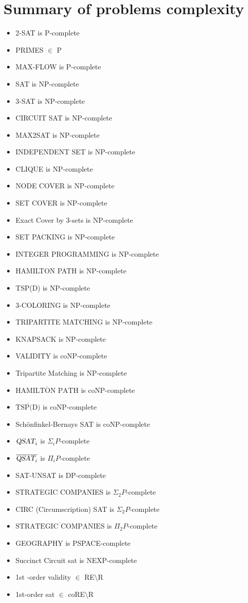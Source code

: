 \section{Summary of problems complexity}
\begin{itemize}
    \item 2-SAT is P-complete
    \item PRIMES $\in$ P
    \item MAX-FLOW is P-complete
    \item SAT is NP-complete
    \item 3-SAT is NP-complete
    \item CIRCUIT SAT is NP-complete
    \item MAX2SAT is NP-complete
    \item INDEPENDENT SET is NP-complete
    \item CLIQUE is NP-complete
    \item NODE COVER is NP-complete
    \item SET COVER is NP-complete
    \item Exact Cover by 3-sets is NP-complete
    \item SET PACKING is NP-complete
    \item INTEGER PROGRAMMING is NP-complete
    \item HAMILTON PATH is NP-complete
    \item TSP(D) is NP-complete
    \item 3-COLORING is NP-complete
    \item TRIPARTITE MATCHING is NP-complete
    \item KNAPSACK is NP-complete
    \item VALIDITY is coNP-complete
    \item Tripartite Matching is NP-complete
    \item $\overline{\text{HAMILTON PATH}}$ is coNP-complete
    \item $\overline{\text{TSP(D)}}$ is coNP-complete
    \item Schönfinkel-Bernays SAT is coNP-complete
    \item $\textsl{QSAT}_i$ is $\Sigma_iP$-complete
    \item $\overline{\textsl{QSAT}_i}$ is $\Pi_iP$-complete
    \item SAT-UNSAT is DP-complete
    \item STRATEGIC COMPANIES is $\Sigma_2P$-complete
    \item CIRC (Circumscription) SAT is $\Sigma_2P$-complete
    \item $\overline{\text{STRATEGIC COMPANIES}}$ is $\Pi_2P$-complete
    \item GEOGRAPHY is PSPACE-complete
    \item Succinct Circuit sat is NEXP-complete
    \item 1st -order validity $\in$ RE$\setminus$R
    \item 1st-order sat $\in$ coRE$\setminus$R
\end{itemize}